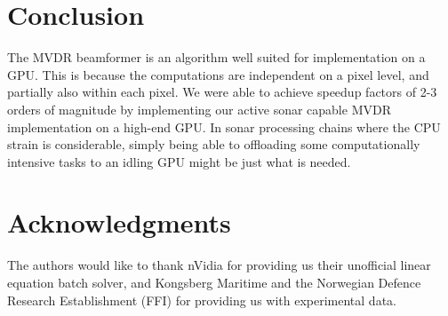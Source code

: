 \documentclass[10pt,a4paper]{article}
\newcommand\1{\vec 1}
\begin{document}
\section{Conclusion}

The \gls{MVDR} beamformer is an algorithm well suited for implementation on a \gls{GPU}. This is because the computations are independent on a pixel level, and partially also within each pixel. We were able to achieve speedup factors of 2-3 orders of magnitude by implementing our active sonar capable \gls{MVDR} implementation on a high-end \gls{GPU}. In sonar processing chains where the \gls{CPU} strain is considerable, simply being able to offloading some computationally intensive tasks to an idling \gls{GPU} might be just what is needed.








\section*{Acknowledgments}

The authors would like to thank nVidia for providing us their unofficial linear equation batch solver, and Kongsberg Maritime and the Norwegian Defence Research Establishment (FFI) for providing us with experimental data.




\end{document}
